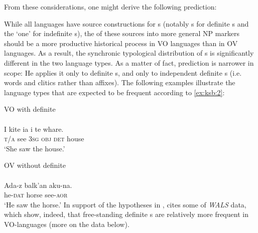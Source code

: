 \documentclass[output=paper]{langsci/langscibook}
\begin{document}
From these considerations, one might derive the following prediction:

\eanoraggedright
{While all languages have source constructions for s (notably s for definite s and the  ‘one’ for indefinite s), the  of these sources into more general NP markers should be a more productive historical process in VO languages than in OV languages. As a result, the synchronic typological distribution of s is significantly different in the two language types.}
\z
\noindent As a matter of fact,  prediction is narrower in scope: He applies it only to definite s, and only to independent definite s (i.e. words and clitics rather than affixes). The following examples illustrate the language types that are expected to be frequent according to \ref{ex:ksb:2}:

\ea\label{ex:ksb:2}
\ea  VO with definite \\
\\
\gll I kite ia i te whare.\\
     \textsc{t/a}   see 3\textsc{sg}   \textsc{obj}   \textsc{det}   house\\
\glt ‘She saw the house.’

\ex
 OV without definite \\ 
\\
\gll Ada-z  balk’an   aku-na.\\
     he-\textsc{dat}   horse     see-\textsc{aor}\\
\glt ‘He saw the horse.’
\z
\z\newpage
\noindent In support of the hypotheses in ,  cites some of  \textit{WALS} data, which show, indeed, that free-standing definite s are relatively more frequent in VO-languages (more on the data below).
\end{document}
